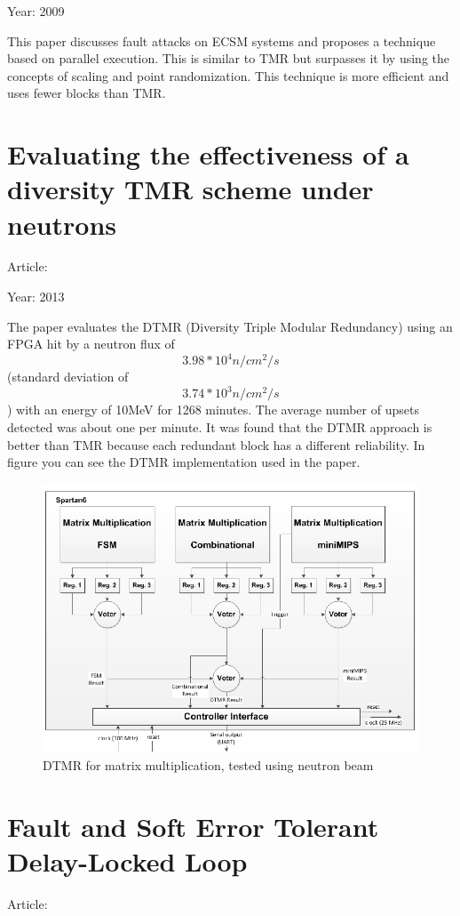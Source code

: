 {{		Year: 2009
		
		This paper discusses fault attacks on ECSM systems and proposes a technique based on parallel execution. This is similar to TMR but surpasses it by using the concepts of scaling and point randomization. This technique is more efficient and uses fewer blocks than TMR.
	}
	\section{Evaluating the effectiveness of a diversity TMR scheme under neutrons}{
		Article: \cite{Evaluating_the_effectiveness_of_a_diversity_TMR_scheme_under_neutrons}
		
		Year: 2013
		
		The paper evaluates the DTMR (Diversity Triple Modular Redundancy) using an FPGA hit by a neutron flux of \[3.98*10^4 n/cm^2/s\] (standard deviation of \[3.74*10^3 n/cm^2/s\]) with an energy of 10MeV for 1268 minutes. The average number of upsets detected was about one per minute. It was found that the DTMR approach is better than TMR because each redundant block has a different reliability. In figure  you can see the DTMR implementation used in the paper.
		\begin{figure}[H]
			\centering
			\includegraphics[scale=0.5]{./images/Articles_image/Evaluating_the_effectiveness_of_a_diversity_TMR_scheme_under_neutrons_DTMR.png}
			\caption{DTMR for matrix multiplication, tested using neutron beam}
			\label{fig:DTMR}
		\end{figure}			
	}
	\section{Fault and Soft Error Tolerant Delay-Locked Loop}{
		Article: \cite{Fault_and_Soft_Error_Tolerant_Delay-Locked_Loop}
		
}}
